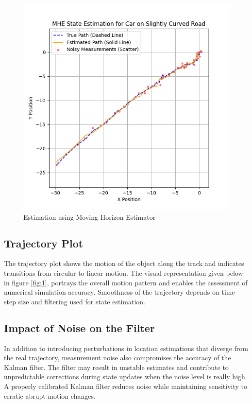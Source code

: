 \documentclass[a4paper,11pt]{article}
\begin{document}
\begin{figure} [H]
    \centering
    \includegraphics[width=0.8\linewidth]{Figure_4.png}
    \caption{Estimation using Moving Horizon Estimator}
    \label{fig:4}
\end{figure}



\subsection*{Trajectory Plot}
The trajectory plot shows the motion of the object along the track and indicates transitions from circular to linear motion. The visual representation given below in figure \ref{fig:1}, portrays the overall motion pattern and enables the assessment of numerical simulation accuracy. 
Smoothness of the trajectory depends on time step size and filtering used for state estimation. 

\subsection*{Impact of Noise on the Filter}
In addition to introducing perturbations in location estimations that diverge from the real trajectory, measurement noise also compromises the accuracy of the Kalman filter. The filter may result in unstable estimates and contribute to unpredictable corrections during state updates when the noise level is really high. A properly calibrated Kalman filter reduces noise while maintaining sensitivity to erratic abrupt motion changes.
\end{document}
